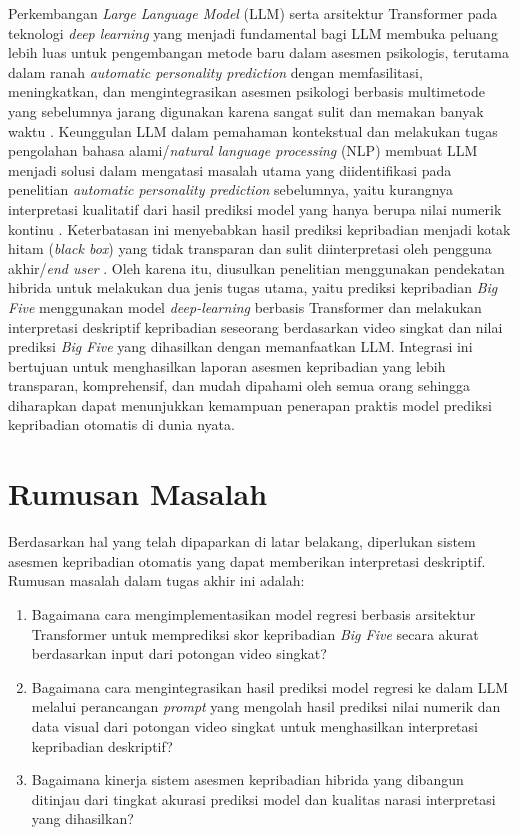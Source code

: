 Perkembangan \textit{Large Language Model} (LLM) serta arsitektur Transformer pada teknologi \textit{deep learning} yang menjadi fundamental bagi LLM membuka peluang lebih luas untuk pengembangan metode baru dalam asesmen psikologis, terutama dalam ranah \textit{automatic personality prediction} dengan memfasilitasi, meningkatkan, dan mengintegrasikan asesmen psikologi berbasis multimetode yang sebelumnya jarang digunakan karena sangat sulit dan memakan banyak waktu \parencite{Brickman2025}. Keunggulan LLM dalam pemahaman kontekstual dan melakukan tugas pengolahan bahasa alami/\textit{natural language processing} (NLP) membuat LLM menjadi solusi dalam mengatasi masalah utama yang diidentifikasi pada penelitian \textit{automatic personality prediction} sebelumnya, yaitu kurangnya interpretasi kualitatif dari hasil prediksi model yang hanya berupa nilai numerik kontinu \parencite{Feizi-Derakhshi2022}. Keterbatasan ini menyebabkan hasil prediksi kepribadian menjadi kotak hitam (\textit{black box}) yang tidak transparan dan sulit diinterpretasi oleh pengguna akhir/\textit{end user} \parencite{Brickman2025,Naz2025}. Oleh karena itu, diusulkan penelitian menggunakan pendekatan hibrida untuk melakukan dua jenis tugas utama, yaitu prediksi kepribadian \textit{Big Five} menggunakan model \textit{deep-learning} berbasis Transformer dan melakukan interpretasi deskriptif kepribadian seseorang berdasarkan video singkat dan nilai prediksi \textit{Big Five} yang dihasilkan dengan memanfaatkan LLM. Integrasi ini bertujuan untuk menghasilkan laporan asesmen kepribadian yang lebih transparan, komprehensif, dan mudah dipahami oleh semua orang sehingga diharapkan dapat menunjukkan kemampuan penerapan praktis model prediksi kepribadian otomatis di dunia nyata.

\section{Rumusan Masalah}
\label{sec:rumusanmasalah}

Berdasarkan hal yang telah dipaparkan di latar belakang, diperlukan sistem asesmen kepribadian otomatis yang dapat memberikan interpretasi deskriptif. Rumusan masalah dalam tugas akhir ini adalah:

\begin{enumerate}[nosep]
	\item Bagaimana cara mengimplementasikan model regresi berbasis arsitektur Transformer untuk memprediksi skor kepribadian \textit{Big Five} secara akurat berdasarkan input dari potongan video singkat?

	\item Bagaimana cara mengintegrasikan hasil prediksi model regresi ke dalam LLM melalui perancangan \textit{prompt} yang mengolah hasil prediksi nilai numerik dan data visual dari potongan video singkat untuk menghasilkan interpretasi kepribadian deskriptif?

	\item Bagaimana kinerja sistem asesmen kepribadian hibrida yang dibangun ditinjau dari tingkat akurasi prediksi model dan kualitas narasi interpretasi yang dihasilkan?
\end{enumerate}


